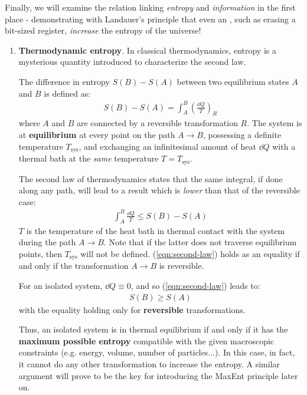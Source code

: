 \documentclass[../../main.tex]{subfiles}
\begin{document}
\medskip

Finally, we will examine the relation linking \textit{entropy} and \textit{information} in the first place - demonstrating with Landauer's principle that even an , such as erasing a bit-sized register, \textit{increase} the entropy of the universe! %

\begin{enumerate}
    \item \textbf{Thermodynamic entropy}. In classical thermodynamics, entropy is a mysterious quantity introduced to characterize the second law.
    

    The difference in entropy $S(B) - S(A)$ between two equilibrium states $A$ and $B$ is defined as:
    \begin{align}\label{eqn:entropy-CT}
        S(B) - S(A) = \int_A^B \left(\frac{\dd{Q}}{T} \right)_R
    \end{align}
    where $A$ and $B$ are connected by a reversible transformation $R$. The system is at \textbf{equilibrium} at every point on the path $A \to B$, possessing a definite temperature $T_{\mathrm{sys}}$, and exchanging an infinitesimal amount of heat $\dd{Q}$ with a thermal bath at the \textit{same} temperature $T=T_{\mathrm{sys}}$.  

    The second law of thermodynamics states that the same integral, if done along any path, will lead to a result which is \textit{lower} than that of the reversible case:   
    \begin{align}\label{eqn:second-law}
        \int_A^B \frac{\dd{Q}}{T} \leq S(B) - S(A) 
    \end{align}
    $T$ is the temperature of the heat bath in thermal contact with the system during the path $A \to B$. Note that if the latter does not traverse equilibrium points, then $T_{\mathrm{sys}}$ will not be defined. 
    (\ref{eqn:second-law}) holds as an equality if and only if the transformation $A \to B$ is reversible.

    \medskip

    For an isolated system, $\dd{Q} \equiv 0$, and so (\ref{eqn:second-law}) leads to:
    \begin{align*}
        S(B) \geq S(A)
    \end{align*}
    with the equality holding only for \textbf{reversible} transformations.
    
    Thus, an isolated system is in thermal equilibrium if and only if it has the \textbf{maximum possible entropy} compatible with the given macroscopic constraints (e.g. energy, volume, number of particles...). In this case, in fact, it cannot do any other transformation to increase the entropy. A similar argument will prove to be the key for introducing the MaxEnt principle later on.


\end{enumerate}
\end{document}
